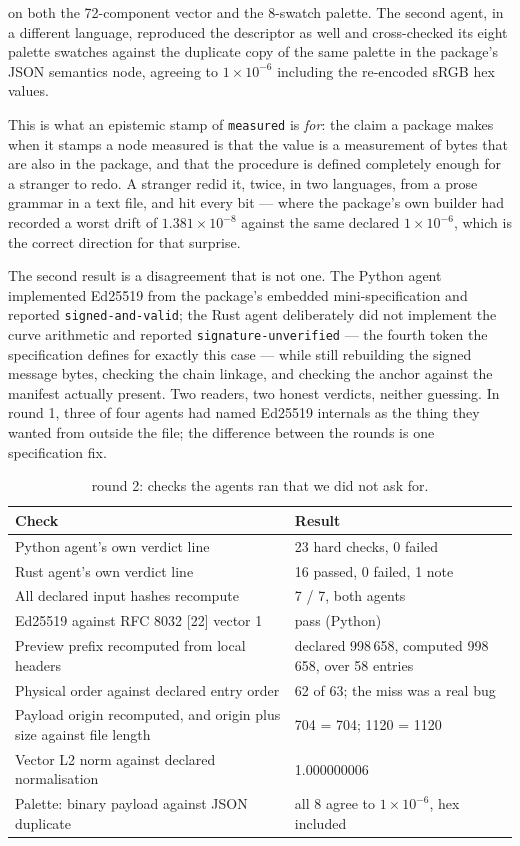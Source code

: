 \documentclass[10pt,twocolumn,letterpaper]{article}
\newcommand{\code}[1]{\texttt{\small #1}}
\begin{document}
on both the 72-component vector and the 8-swatch palette. The second agent, in a different language, reproduced the descriptor as well and cross-checked its eight palette swatches against the duplicate copy of the same palette in the package's JSON semantics node, agreeing to $1\times10^{-6}$ including the re-encoded sRGB hex values.

This is what an epistemic stamp of \code{measured} is \emph{for}: the claim a package makes when it stamps a node measured is that the value is a measurement of bytes that are also in the package, and that the procedure is defined completely enough for a stranger to redo. A stranger redid it, twice, in two languages, from a prose grammar in a text file, and hit every bit --- where the package's own builder had recorded a worst drift of $1.381\times10^{-8}$ against the same declared $1\times10^{-6}$, which is the correct direction for that surprise.

The second result is a disagreement that is not one. The Python agent implemented Ed25519 from the package's embedded mini-specification and reported \code{signed-and-valid}; the Rust agent deliberately did not implement the curve arithmetic and reported \code{signature-unverified} --- the fourth token the specification defines for exactly this case --- while still rebuilding the signed message bytes, checking the chain linkage, and checking the anchor against the manifest actually present. Two readers, two honest verdicts, neither guessing. In round 1, three of four agents had named Ed25519 internals as the thing they wanted from outside the file; the difference between the rounds is one specification fix.

\begin{table}[t]\centering\footnotesize
\caption{round 2: checks the agents ran that we did not ask for.}
\begin{tabular}{@{}L{4.4cm} L{2.9cm}@{}}
\toprule
Check & Result \\
\midrule
Python agent's own verdict line & 23 hard checks, 0 failed \\
Rust agent's own verdict line & 16 passed, 0 failed, 1 note \\
All declared input hashes recompute & 7 / 7, both agents \\
Ed25519 against RFC 8032 [22] vector 1 & pass (Python) \\
Preview prefix recomputed from local headers & declared 998\,658, computed 998\,658, over 58 entries \\
Physical order against declared entry order & 62 of 63; the miss was a real bug \\
Payload origin recomputed, and origin plus size against file length & 704 = 704; 1120 = 1120 \\
Vector L2 norm against declared normalisation & 1.000000006 \\
Palette: binary payload against JSON duplicate & all 8 agree to $1\times10^{-6}$, hex included \\
\bottomrule
\end{tabular}
\end{table}
\end{document}
